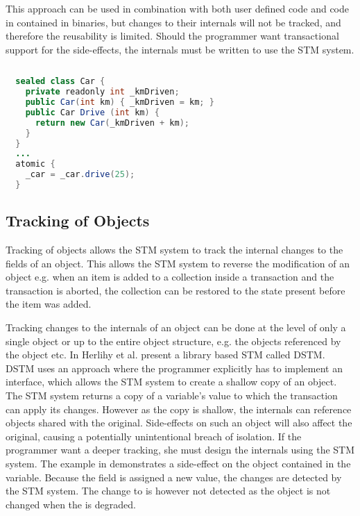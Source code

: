 This approach can be used in combination with both user defined code and code in contained in binaries, but changes to their internals will not be tracked, and therefore the reusability is limited. Should the programmer want transactional support for the side-effects, the internals must be written to use the \ac{STM} system.

%
\begin{lstlisting}[label=lst:tracking_variable,
 float,
 caption={Tracking Assignment to Variables},
 language=Java, 
 showspaces=false,
 showtabs=false,
 breaklines=true,
 showstringspaces=false,
 breakatwhitespace=true,
 commentstyle=\color{greencomments},
 keywordstyle=\color{bluekeywords},
 stringstyle=\color{redstrings},
 morekeywords={atomic, retry, orElse, var, get, set, sealed}]  % Start your code-block
 
  sealed class Car {
    private readonly int _kmDriven;
    public Car(int km) { _kmDriven = km; }
    public Car Drive (int km) {
      return new Car(_kmDriven + km);
    }
  }
  ...
  atomic {
    _car = _car.drive(25);
  }
\end{lstlisting}
%
\subsection{Tracking of Objects}
Tracking of objects allows the \ac{STM} system to track the internal changes to the fields of an object. This allows the \ac{STM} system to reverse the modification of an object e.g. when an item is added to a collection inside a transaction and the transaction is aborted, the collection can be restored to the state present before the item was added.

Tracking changes to the internals of an object can be done at the level of only a single object or up to the entire object structure, e.g. the objects referenced by the object etc. In \cite{herlihy2003software} Herlihy et al. present a library based \ac{STM} called \ac{DSTM}. \ac{DSTM} uses an approach where the programmer explicitly has to implement an interface, which allows the \ac{STM} system to create a shallow copy of an object. The \ac{STM} system returns a copy of a variable's value to which the transaction can apply its changes. However as the copy is shallow, the internals can reference objects shared with the original. Side-effects on such an object will also affect the original, causing a potentially unintentional breach of isolation. If the programmer want a deeper tracking, she must design the internals using the \ac{STM} system. The example in  demonstrates a side-effect on the object contained in the  variable.  Because the  field is assigned a new value, the changes are detected by the \ac{STM} system. The change to  is however not detected as the  object is not changed when the  is degraded.

